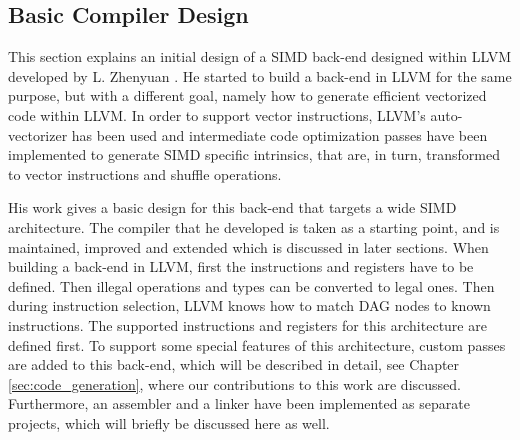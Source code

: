  


\subsection{Basic Compiler Design}\label{sec:basic_compiler_design}
This section explains an initial design of a SIMD back-end designed within LLVM developed by L. Zhenyuan \cite{liu_zhenyuan}. He started to build a back-end in LLVM for the same purpose, but with a different goal, namely how to generate efficient vectorized code within LLVM. In order to support vector instructions, LLVM's auto-vectorizer has been used and intermediate code optimization passes have been implemented to generate SIMD specific intrinsics, that are, in turn, transformed to vector instructions and shuffle operations. 

His work gives a basic design for this back-end that targets a wide SIMD architecture. The compiler that he developed is taken as a starting point, and is maintained, improved and extended which is discussed in later sections. When building a back-end in LLVM, first the instructions and registers have to be defined. Then illegal operations and types can be converted to legal ones. Then during instruction selection, LLVM knows how to match DAG nodes to known instructions. The supported instructions and registers for this architecture are defined first. To support some special features of this architecture, custom passes are added to this back-end, which will be described in detail, see Chapter \ref{sec:code_generation}, where our contributions to this work are discussed. Furthermore, an assembler and a linker have been implemented as separate projects, which will briefly be discussed here as well.

